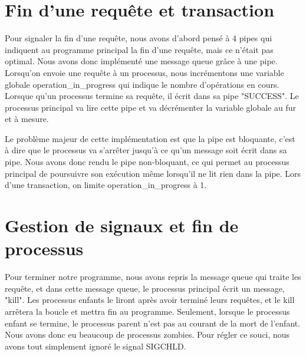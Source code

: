 \documentclass[utf8]{article}
\begin{document}
\section{Fin d'une requête et transaction}

\indent{}
\par

Pour signaler la fin d'une requête, nous avons d'abord pensé à 4 pipes qui indiquent au programme principal 
la fin d'une requête, mais ce n'était pas optimal. Nous avons donc implémenté une message queue grâce à une pipe. Lorsqu'on envoie 
une requête à un processus, nous incrémentons une variable globale operation\_in\_progress qui indique le nombre d'opérations en cours.
Lorsque qu'un processus termine sa requête, il écrit dans sa pipe "SUCCESS". Le processus principal va lire cette pipe et va décrémenter
la variable globale au fur et à mesure. 
\par
\indent{}
\par
Le problème majeur de cette implémentation est que la pipe est bloquante, c'est à dire que le processus
va s'arrêter jusqu'à ce qu'un message soit écrit dans sa pipe. Nous avons donc rendu le pipe non-bloquant, ce qui permet au processus principal de poursuivre son exécution
même lorsqu'il ne lit rien dans la pipe. Lors d'une transaction, on limite operation\_in\_progress à 1.
\par

\section{Gestion de signaux et fin de processus}
\indent{}
\par
Pour terminer notre programme, nous avons repris la message queue qui traite les requête, et dans 
cette message queue, le processus principal écrit un message, "kill". Les processus enfants le liront après avoir terminé leurs requêtes,
et le kill arrêtera la boucle et mettra fin au programme.
Seulement, lorsque le processus enfant se termine, le processus parent n'est pas au courant de la mort de l'enfant. Nous avons donc eu 
beaucoup de processus zombies. Pour régler ce souci, nous avons tout simplement ignoré le signal SIGCHLD.
\par
\end{document}
